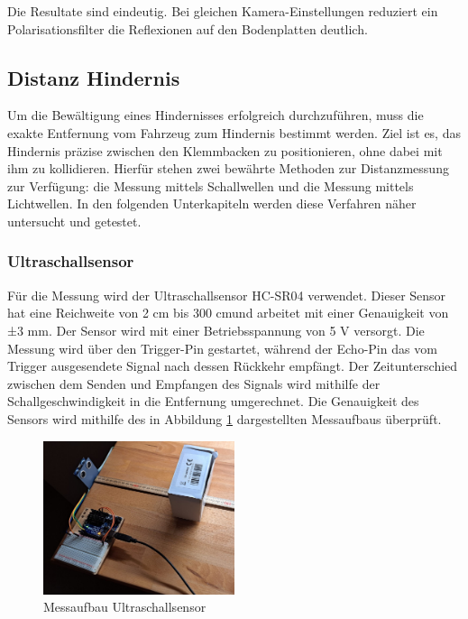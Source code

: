 \documentclass[../main.tex]{subfiles}
\begin{document}
Die Resultate sind eindeutig. Bei gleichen Kamera-Einstellungen reduziert ein Polarisationsfilter die Reflexionen auf den Bodenplatten deutlich.
\newpage
\subsection{Distanz Hindernis} 
\label{sec:Distanz_Hindernis}
Um die Bewältigung eines Hindernisses erfolgreich durchzuführen, muss die exakte Entfernung vom Fahrzeug zum Hindernis bestimmt werden. Ziel ist es, das Hindernis präzise zwischen den Klemmbacken zu positionieren, ohne dabei mit ihm zu kollidieren. Hierfür stehen zwei bewährte Methoden zur Distanzmessung zur Verfügung: die Messung mittels Schallwellen und die Messung mittels Lichtwellen. In den folgenden Unterkapiteln werden diese Verfahren näher untersucht und getestet.

\subsubsection{Ultraschallsensor}
Für die Messung wird der Ultraschallsensor HC-SR04 verwendet. Dieser Sensor hat eine Reichweite von 2 cm bis 300 cm\footnotemark und arbeitet mit einer Genauigkeit von ±3 mm. Der Sensor wird mit einer Betriebsspannung von 5 V versorgt. Die Messung wird über den Trigger-Pin gestartet, während der Echo-Pin das vom Trigger ausgesendete Signal nach dessen Rückkehr empfängt. Der Zeitunterschied zwischen dem Senden und Empfangen des Signals wird mithilfe der Schallgeschwindigkeit in die Entfernung umgerechnet. Die Genauigkeit des Sensors wird mithilfe des in Abbildung \ref{fig:Ultraschall1} dargestellten Messaufbaus überprüft.

\begin{figure}[h] %
    \centering
    \includegraphics[width=0.5\textwidth]{img/sensortest/MA_Ultraschall.jpg} %
    \caption{Messaufbau Ultraschallsensor}
    \label{fig:Ultraschall1} %
\end{figure}
\end{document}
